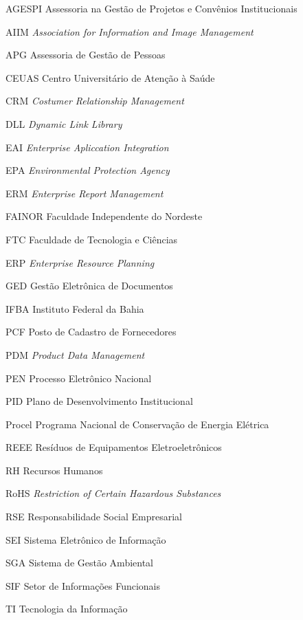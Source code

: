 \begin{siglas}
    \item[AGESPI]   Assessoria na Gestão de Projetos e Convênios Institucionais
    \item[AIIM]	    \textit{Association for Information and Image Management}
    \item[APG]	    Assessoria de Gestão de Pessoas
    \item[CEUAS]	Centro Universitário de Atenção à Saúde
    \item[CRM]	    \textit{Costumer Relationship Management}
    \item[DLL]	    \textit{Dynamic Link Library}
    \item[EAI]	    \textit{Enterprise Apliccation Integration}
    \item[EPA]	    \textit{Environmental Protection Agency}
    \item[ERM]  	\textit{Enterprise Report Management}
    \item[FAINOR]	Faculdade Independente do Nordeste
    \item[FTC]  	Faculdade de Tecnologia e Ciências
    \item[ERP]	    \textit{Enterprise Resource Planning}
    \item[GED]	    Gestão Eletrônica de Documentos
    \item[IFBA]	    Instituto Federal da Bahia
    \item[PCF]	    Posto de Cadastro de Fornecedores
    \item[PDM]	    \textit{Product Data Management}
    \item[PEN]	    Processo Eletrônico Nacional
    \item[PID]  	Plano de Desenvolvimento Institucional
    \item[Procel]	Programa Nacional de Conservação de Energia Elétrica
    \item[REEE]	    Resíduos de Equipamentos Eletroeletrônicos
    \item[RH]   	Recursos Humanos
    \item[RoHS]	    \textit{Restriction of Certain Hazardous Substances}
    \item[RSE]  	Responsabilidade Social Empresarial
    \item[SEI]  	Sistema Eletrônico de Informação
    \item[SGA]  	Sistema de Gestão Ambiental
    \item[SIF]  	Setor de Informações Funcionais
    \item[TI]   	Tecnologia da Informação

\end{siglas}
